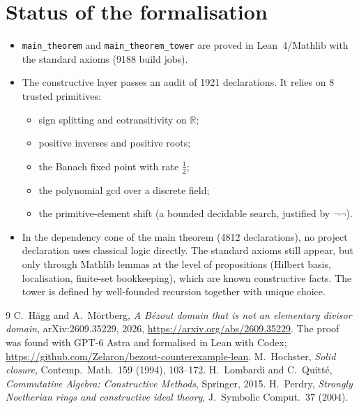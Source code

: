 \documentclass[11pt]{article}
\newcommand{\R}{\mathbb{R}}
\newcommand{\code}[1]{\texttt{#1}}
\begin{document}
\section{Status of the formalisation}

\begin{itemize}
\item \code{main\_theorem} and \code{main\_theorem\_tower} are proved in Lean~4/Mathlib with the
  standard axioms (9188 build jobs).
\item The constructive layer passes an audit of 1921 declarations. It relies on 8 trusted
  primitives:
  \begin{itemize}
  \item sign splitting and cotransitivity on $\R$;
  \item positive inverses and positive roots;
  \item the Banach fixed point with rate $\tfrac12$;
  \item the polynomial gcd over a discrete field;
  \item the primitive-element shift (a bounded decidable search, justified by $\neg\neg$).
  \end{itemize}
\item In the dependency cone of the main theorem (4812 declarations), no project declaration
  uses classical logic directly. The standard axioms still appear, but only through
  Mathlib lemmas at the level of propositions (Hilbert basis, localisation, finite-set
  bookkeeping), which are known constructive facts. The tower is defined by well-founded
  recursion together with unique choice.
\end{itemize}

\begin{thebibliography}{9}
 C.~Hägg and A.~Mörtberg, \emph{A Bézout domain that is not an elementary divisor domain},
  arXiv:2609.35229, 2026, \url{https://arxiv.org/abs/2609.35229}. The proof was found with GPT-6 Astra and formalised in Lean with Codex;
  \url{https://github.com/Zelaron/bezout-counterexample-lean}.
 M.~Hochster, \emph{Solid closure}, Contemp.\ Math.\ 159 (1994), 103--172.
 H.~Lombardi and C.~Quitté, \emph{Commutative Algebra: Constructive Methods},
  Springer, 2015.
 H.~Perdry, \emph{Strongly Noetherian rings and constructive ideal theory},
  J.~Symbolic Comput.\ 37 (2004).
\end{thebibliography}
\end{document}
